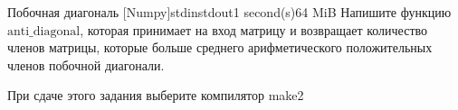 \begin{problem}{Побочная диагональ [Numpy]}{stdin}{stdout}{1 second(s)}{64 MiB}
 Напишите функцию $\text{anti_diagonal}$, которая принимает на вход матрицу и возвращает количество членов матрицы, которые больше среднего арифметического положительных членов побочной диагонали.
\InputFile

\OutputFile

\Examples
\begin{example}
\end{example}\Note
 При сдаче этого задания выберите компилятор make2
\end{problem}
